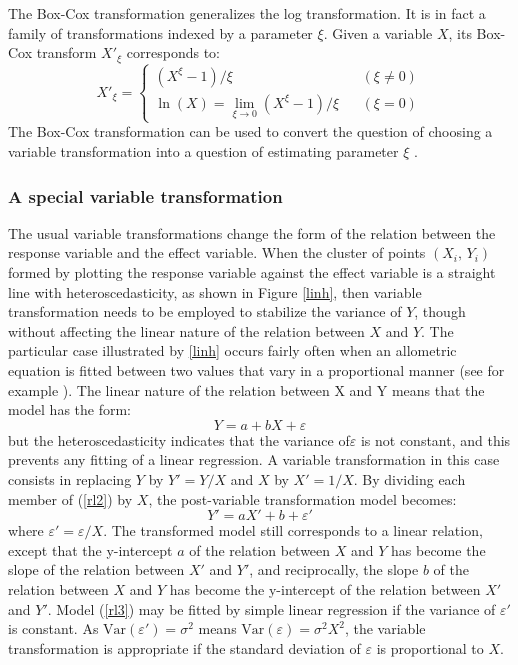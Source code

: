 The Box-Cox transformation generalizes the log transformation. It is in fact a family of transformations indexed by a parameter $\xi$. Given a variable $X$, its Box-Cox transform $X'_{\xi}$ corresponds to:
\[
X'_{\xi}=\left\{
\begin{array}{lcl}
(X^{\xi}-1)/\xi && (\xi\neq0)\\ %
\ln(X)=\lim_{\xi\rightarrow0}(X^{\xi}-1)/\xi && (\xi=0)
\end{array}
\right.
\]
The Box-Cox transformation can be used to convert the question of choosing a variable transformation into a question of estimating parameter $\xi$ \citep{hoeting99}.

\subsubsection{A special variable transformation\label{apart}}

The usual variable transformations change the form of the relation between the response variable and the effect variable. When the cluster of points $(X_i,\,Y_i)$ formed by plotting the response variable against the effect variable is a straight line with heteroscedasticity, as shown in  Figure \ref{linh}, then variable transformation needs to be employed to stabilize the variance of $Y$, though without affecting the linear nature of the relation between $X$ and $Y$. The particular case illustrated by \ref{linh} occurs fairly often when an allometric equation is fitted between two values that vary in a proportional manner (see for example \citealp{ngomanda12}). The linear nature of the relation between X and Y means that the model has the form:
\begin{equation}
Y=a+bX+\varepsilon\label{rl2}
\end{equation}
but the heteroscedasticity indicates that the variance of$\varepsilon$ is not constant, and this prevents any fitting of a linear regression. A variable transformation in this case consists in replacing $Y$ by $Y'=Y/X$ and $X$ by $X'=1/X$. By dividing each member of (\ref{rl2}) by $X$, the post-variable transformation model becomes:
\begin{equation}
Y'=aX'+b+\varepsilon'\label{rl3}
\end{equation}
where $\varepsilon'=\varepsilon/X$. The transformed model still corresponds to a linear relation, except that the y-intercept $a$ of the relation between $X$ and $Y$ has become the slope of the relation between $X'$ and $Y'$, and reciprocally, the slope $b$ of the relation between $X$ and $Y$ has become the y-intercept of the relation between $X'$ and $Y'$. Model (\ref{rl3}) may be fitted by simple linear regression if the variance of $\varepsilon'$ is constant. As 
$\mathrm{Var}(\varepsilon')=\sigma^2$ means
$\mathrm{Var}(\varepsilon)=\sigma^2X^2$, the variable transformation is appropriate if the standard deviation of
$\varepsilon$ is proportional to $X$.

